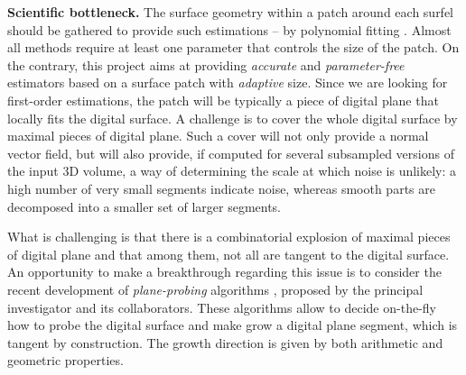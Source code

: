 \noindent\textbf{Scientific bottleneck.}
The surface geometry within a patch around each surfel should be gathered to provide such estimations
-- \eg by polynomial fitting \cite{Cazals2005,Cazals2008}.
Almost all methods require at least one parameter that controls the size of the patch.  
On the contrary, this project aims at providing \emph{accurate} and \emph{parameter-free} estimators
based on a surface patch with \emph{adaptive} size.
Since we are looking for first-order estimations, the patch will be typically a piece of digital plane
that locally fits the digital surface. %
A challenge is to cover the whole digital surface by maximal pieces of digital plane. 
Such a cover will not only provide a normal vector field, but will also provide, if computed
for several subsampled versions of the input 3D volume, a way of determining the scale 
at which noise is unlikely: a high number of very small segments indicate noise, whereas
smooth parts are decomposed into a smaller set of larger segments.    

What is challenging is that there is a combinatorial explosion
of maximal pieces of digital plane \cite{Sivignon2009} and that among them,
not all are tangent to the digital surface.  
An opportunity to make a breakthrough regarding this issue is to consider the recent development
of \emph{plane-probing} algorithms \cite{LPRTCS2016, LPRDGCI2016, LPRJMIV2017},
proposed by the principal investigator and its collaborators.
These algorithms allow to decide
on-the-fly how to probe the digital surface and make grow a digital plane segment,
which is tangent by construction. The growth direction is given by both arithmetic and geometric properties.

